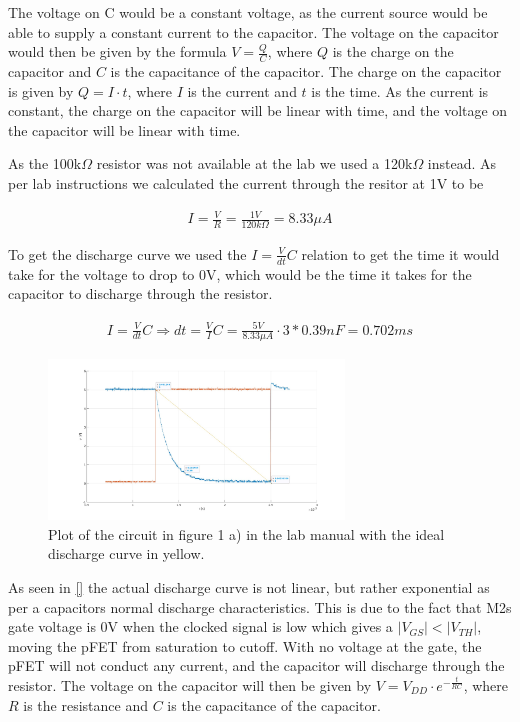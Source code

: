 \documentclass[onecolumn]{article}
\begin{document}
The voltage on C would be a constant voltage, as the current source would be able to supply a constant current to the capacitor. The voltage on the capacitor would then be given by the formula $V = \frac{Q}{C}$, where $Q$ is the charge on the capacitor and $C$ is the capacitance of the capacitor. The charge on the capacitor is given by $Q = I \cdot t$, where $I$ is the current and $t$ is the time. As the current is constant, the charge on the capacitor will be linear with time, and the voltage on the capacitor will be linear with time.

As the 100k$\Omega$ resistor was not available at the lab we used a 120k$\Omega$ instead. As per lab instructions we calculated the current through the resitor at 1V to be 

\begin{align}
    I = \frac{V}{R} = \frac{1V}{120k\Omega} = 8.33\mu A
\end{align}

To get the discharge curve we used the $I = \frac{V}{dt}C$ relation to get the time it would take for the voltage to drop to 0V, which would be the time it takes for the capacitor to discharge through the resistor.

\begin{align}
    I = \frac{V}{dt}C \Rightarrow dt = \frac{V}{I} C = \frac{5V}{8.33\mu A}\cdot 3*0.39nF = 0.702ms
\end{align}

\begin{figure}[h!]
    \centering
    \includegraphics[width=0.7\textwidth]{1a.jpg}
    \caption{Plot of the circuit in figure 1 a) in the lab manual with the ideal discharge curve in yellow.}
    \label{fig:task1a}
\end{figure}

As seen in \ref{} the actual discharge curve is not linear, but rather exponential as per a capacitors normal discharge characteristics. This is due to the fact that M2s gate voltage is 0V when the clocked signal is low which gives a $|V_{GS}| \lt |V_{TH}|$, moving the pFET from saturation to cutoff. With no voltage at the gate, the pFET will not conduct any current, and the capacitor will discharge through the resistor. The voltage on the capacitor will then be given by $V = V_{DD} \cdot e^{-\frac{t}{RC}}$, where $R$ is the resistance and $C$ is the capacitance of the capacitor.
\end{document}
